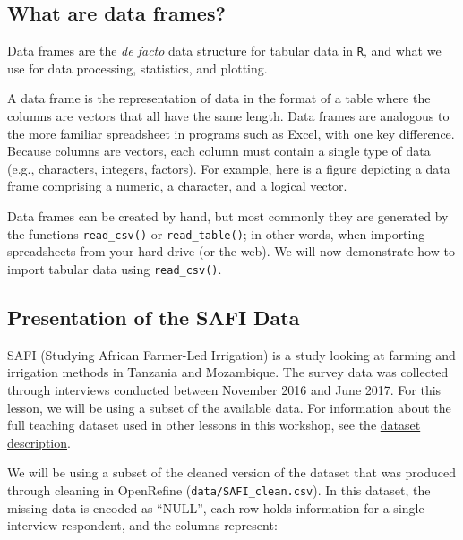 \documentclass[
]{article}
\begin{document}
\subsection{What are data frames?}\label{what-are-data-frames}

Data frames are the \emph{de facto} data structure for tabular data in
\texttt{R}, and what we use for data processing, statistics, and
plotting.

A data frame is the representation of data in the format of a table
where the columns are vectors that all have the same length. Data frames
are analogous to the more familiar spreadsheet in programs such as
Excel, with one key difference. Because columns are vectors, each column
must contain a single type of data (e.g., characters, integers,
factors). For example, here is a figure depicting a data frame
comprising a numeric, a character, and a logical vector.



Data frames can be created by hand, but most commonly they are generated
by the functions \texttt{read\_csv()} or \texttt{read\_table()}; in
other words, when importing spreadsheets from your hard drive (or the
web). We will now demonstrate how to import tabular data using
\texttt{read\_csv()}.

\subsection{Presentation of the SAFI
Data}\label{presentation-of-the-safi-data}

SAFI (Studying African Farmer-Led Irrigation) is a study looking at
farming and irrigation methods in Tanzania and Mozambique. The survey
data was collected through interviews conducted between November 2016
and June 2017. For this lesson, we will be using a subset of the
available data. For information about the full teaching dataset used in
other lessons in this workshop, see the
\href{https://datacarpentry.org/socialsci-workshop/index.html\#data}{dataset
description}.

We will be using a subset of the cleaned version of the dataset that was
produced through cleaning in OpenRefine (\texttt{data/SAFI\_clean.csv}).
In this dataset, the missing data is encoded as ``NULL'', each row holds
information for a single interview respondent, and the columns
represent:
\end{document}
